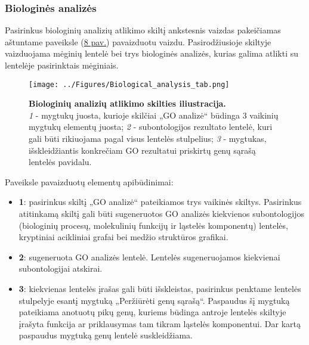 \documentclass[12pt]{article}
\begin{document}
\newpage

\subsubsection*{Biologinės analizės}
Pasirinkus biologinių analizių atlikimo skiltį ankstesnis vaizdas pakeičiamas
aštuntame paveiksle (\hyperref[fig:image8]{8 pav.}) pavaizduotu vaizdu.
Pasirodžiusioje skiltyje vaizduojama mėginių lentelė bei trys biologinės
analizės, kurias galima atlikti su lentelėje pasirinktais mėginiais.

\begin{figure}[ht]
    \begin{center}
        \captionsetup{justification=centering}
        \texttt{[image: ../Figures/Biological\_analysis\_tab.png]}
        \vspace{-1.5\baselineskip}
        \caption{\small\textbf{Biologinių analizių atlikimo skilties
                                iliustracija.}\\
            \emph{1} - mygtukų juosta, kurioje skilčiai „GO analizė“ būdinga 3
                vaikinių mygtukų elementų juosta;
            \emph{2} - subontologijos rezultato lentelė, kuri gali būti
                rikiuojama pagal visus lentelės stulpelius;
            \emph{3} - mygtukas, išskleidžiantis konkrečiam GO rezultatui
                priskirtų genų sąrašą lentelės pavidalu.}
        \label{fig:image8}
    \end{center}
\end{figure}

Paveiksle pavaizduotų elementų apibūdinimai:
\begin{itemize}
    \item \textbf{\large{1}}: pasirinkus skiltį „GO analizė“ pateikiamos
        trys vaikinės skiltys. Pasirinkus atitinkamą skiltį gali būti
        sugeneruotos GO analizės kiekvienos subontologijos (biologinių procesų,
        molekulinių funkcijų ir ląstelės komponentų) lentelės, kryptiniai
        acikliniai grafai bei medžio struktūros grafikai.
    \item \textbf{\large{2}}: sugeneruota GO analizės lentelė. Lentelės
        sugeneruojamos kiekvienai subontologijai atskirai.
    \item \textbf{\large{3}}: kiekvienas lentelės įrašas gali būti išskleistas,
        pasirinkus penktame lentelės stulpelyje esantį mygtuką „Peržiūrėti genų
        sąrašą“. Paspaudus šį mygtuką pateikiama anotuotų pikų genų, kuriems
        būdinga antroje lentelės skiltyje įrašyta funkcija ar priklausymas
        tam tikram ląstelės komponentui. Dar kartą paspaudus mygtuką genų
        lentelė suskleidžiama.
\end{itemize}
\end{document}

